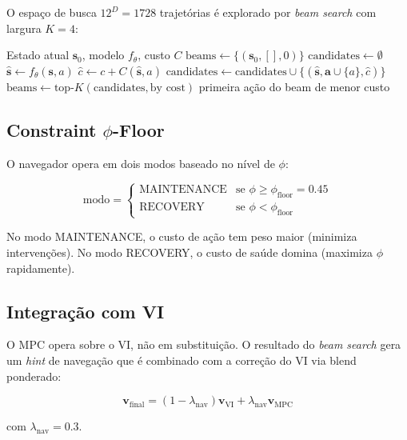 O espa\c{c}o de busca $12^D = 1728$ trajet\'orias \'e explorado por
\textit{beam search} com largura $K = 4$:

\begin{algorithm}[H]
\caption{MPC Beam Search}
\label{alg:mpc_beam}
\begin{algorithmic}[1]
\REQUIRE Estado atual $\bm{s}_0$, modelo $f_\theta$, custo $C$
\STATE $\text{beams} \leftarrow \{(\bm{s}_0, [], 0)\}$ 
    \STATE $\text{candidates} \leftarrow \emptyset$
            \STATE $\hat{\bm{s}} \leftarrow f_\theta(\bm{s}, a)$
            \STATE $\hat{c} \leftarrow c + C(\hat{\bm{s}}, a)$
            \STATE $\text{candidates} \leftarrow \text{candidates} \cup \{(\hat{\bm{s}}, \bm{a} \cup \{a\}, \hat{c})\}$
        \ENDFOR
    \ENDFOR
    \STATE $\text{beams} \leftarrow \text{top-}K(\text{candidates}, \text{by cost})$
\ENDFOR
\RETURN primeira a\c{c}\~ao do beam de menor custo
\end{algorithmic}
\end{algorithm}

\subsection{Constraint $\phi$-Floor}

O navegador opera em dois modos baseado no n\'ivel de $\phi$:

\begin{equation}
    \text{modo} = \begin{cases}
        \text{MAINTENANCE} & \text{se } \phi \geq \phi_{\text{floor}} = 0.45 \\
        \text{RECOVERY} & \text{se } \phi < \phi_{\text{floor}}
    \end{cases}
\end{equation}

No modo MAINTENANCE, o custo de a\c{c}\~ao tem peso maior (minimiza
interven\c{c}\~oes). No modo RECOVERY, o custo de sa\'ude domina (maximiza
$\phi$ rapidamente).

\subsection{Integra\c{c}\~ao com VI}

O MPC opera sobre o VI, n\~ao em substitui\c{c}\~ao. O resultado do
\textit{beam search} gera um \textit{hint} de navega\c{c}\~ao que \'e
combinado com a corre\c{c}\~ao do VI via blend ponderado:

\begin{equation}
    \bm{v}_{\text{final}} = (1 - \lambda_{\text{nav}}) \bm{v}_{\text{VI}} + \lambda_{\text{nav}} \bm{v}_{\text{MPC}}
\end{equation}

com $\lambda_{\text{nav}} = 0.3$.
